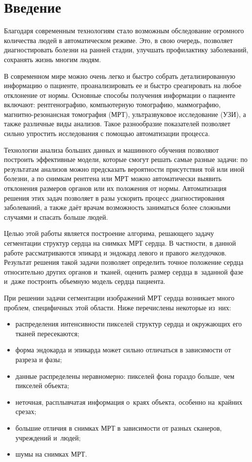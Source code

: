 \section{Введение}

Благодаря современным технологиям стало возможным обследование огромного количества людей в автоматическом режиме. Это, в свою очередь, позволяет диагностировать болезни на ранней стадии, улучшать профилактику заболеваний, сохранять жизнь многим людям.

В современном мире можно очень легко и быстро собрать детализированную информацию о пациенте, проанализировать ее и быстро среагировать на любое отклонение от нормы. Основные способы получения информации о пациенте включают: рентгенографию, компьютерную томографию, маммографию, магнитно-резонансная томография (МРТ), ультразвуковое исследование (УЗИ), а также различные виды анализов. Такое разнообразие показателей позволяет сильно упростить исследования с помощью автоматизации процесса.

Технологии анализа больших данных и машинного обучения позволяют построить эффективные модели, которые смогут решать самые разные задачи: по результатам анализов можно предсказать вероятности присутствия той или иной болезни, а по снимкам рентгена или МРТ можно автоматически выявить отклонения размеров органов или их положения от нормы. Автоматизация решения этих задач позволяет в разы ускорить процесс диагностирования заболеваний, а также даёт врачам возможность заниматься более сложными случаями и спасать больше людей.

Целью этой работы является построение алгорима, решающего задачу сегментации структур сердца на снимках МРТ сердца. В частности, в данной работе рассматриваются эпикард и эндокард левого и правого желудочков. Результат решения такой задачи позволяет определить точное положение сердца относительно других органов и~тканей, оценить размер сердца в~заданной фазе и~даже построить объемную модель сердца пациента.

При решении задачи сегментации изображений МРТ сердца возникает много проблем, специфичных этой области. Ниже перечислены некоторые из~них:

\begin{itemize}
  \item распределения интенсивности пикселей структур сердца и окружающих его тканей пересекаются;
  \item форма эндокарда и эпикарда может сильно отличаться в зависимости от разреза и фазы;
  \item данные распределены неравномерно: пикселей фона гораздо больше, чем пикселей объекта;
  \item неточная, расплывчатая информация о~краях объекта, особенно на~крайних срезах;
  \item большие отличия в снимках МРТ в зависимости от разных сканеров, учреждений и~людей;
  \item шумы на снимках МРТ.
\end{itemize}

